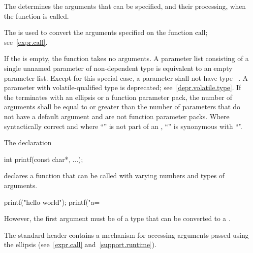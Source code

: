 \pnum
{}%
The
determines the arguments that can be specified, and their processing, when the function is called.
\begin{note}
%
The
is used to convert the arguments specified on the function call;
see~\ref{expr.call}.
\end{note}
%
If the
is empty, the function takes no arguments.
A parameter list consisting of a single unnamed parameter of
non-dependent type  is equivalent to an empty parameter
list.
%
Except for this special case, a parameter shall not have type \cv{}~.
A parameter with volatile-qualified type is deprecated;
see~\ref{depr.volatile.type}.
If the
%
%
%
%
%
terminates with an ellipsis or a function parameter
pack, the number of arguments shall be equal
to or greater than the number of parameters that do not have a default
argument and are not function parameter packs.
Where syntactically correct and where ``'' is not
part of an ,
``''
is synonymous with
``''.
\begin{example}
The declaration
\begin{codeblock}
int printf(const char*, ...);
\end{codeblock}
declares a function that can be called with varying numbers and types of arguments.

\begin{codeblock}
printf("hello world");
printf("a=%
\end{codeblock}

However, the first argument must be of a type
that can be converted to a
.
\end{example}
\begin{note}
The standard header 
contains a mechanism for accessing arguments passed using the ellipsis
(see~\ref{expr.call} and~\ref{support.runtime}).
\end{note}

